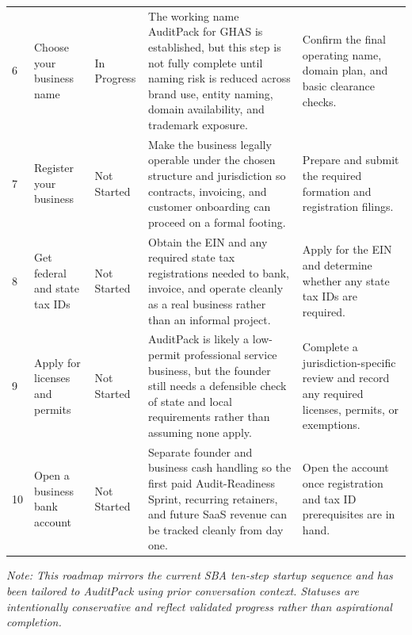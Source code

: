 \documentclass[10pt]{article}
\newcommand{\statusprogress}{\colorbox{ProgBg}{\textcolor{ProgFg}{\strut\hspace{0.35em}In Progress\hspace{0.35em}}}}
\newcommand{\statusnot}{\colorbox{NotBg}{\textcolor{NotFg}{\strut\hspace{0.35em}Not Started\hspace{0.35em}}}}
\begin{document}
\begin{longtable}{@{}L{0.045\textwidth}L{0.155\textwidth}L{0.125\textwidth}L{0.365\textwidth}L{0.21\textwidth}@{}}
6 & Choose your business name & \statusprogress & The working name AuditPack for GHAS is established, but this step is not fully complete until naming risk is reduced across brand use, entity naming, domain availability, and trademark exposure. & Confirm the final operating name, domain plan, and basic clearance checks. \\

7 & Register your business & \statusnot & Make the business legally operable under the chosen structure and jurisdiction so contracts, invoicing, and customer onboarding can proceed on a formal footing. & Prepare and submit the required formation and registration filings. \\

8 & Get federal and state tax IDs & \statusnot & Obtain the EIN and any required state tax registrations needed to bank, invoice, and operate cleanly as a real business rather than an informal project. & Apply for the EIN and determine whether any state tax IDs are required. \\

9 & Apply for licenses and permits & \statusnot & AuditPack is likely a low-permit professional service business, but the founder still needs a defensible check of state and local requirements rather than assuming none apply. & Complete a jurisdiction-specific review and record any required licenses, permits, or exemptions. \\

10 & Open a business bank account & \statusnot & Separate founder and business cash handling so the first paid Audit-Readiness Sprint, recurring retainers, and future SaaS revenue can be tracked cleanly from day one. & Open the account once registration and tax ID prerequisites are in hand. \\
\bottomrule
\end{longtable}
\endgroup

\vspace{0.2em}
{\footnotesize\textit{Note: This roadmap mirrors the current SBA ten-step startup sequence and has been tailored to AuditPack using prior conversation context. Statuses are intentionally conservative and reflect validated progress rather than aspirational completion.}}
\end{document}
